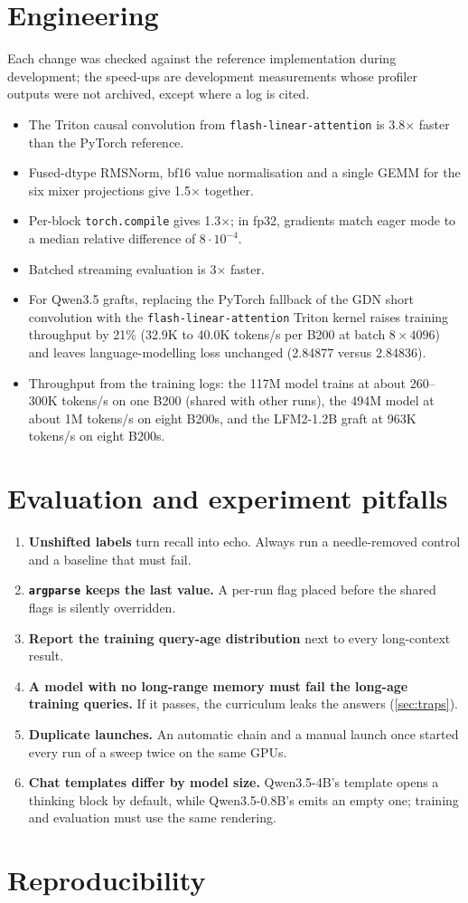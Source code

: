 \documentclass[11pt]{article}
\begin{document}
\section{Engineering}
\label{app:engineering}
Each change was checked against the reference implementation during development; the speed-ups are development measurements whose profiler outputs were not archived, except where a log is cited.
\begin{itemize}
\item The Triton causal convolution from \texttt{flash-linear-attention} is 3.8$\times$ faster than the PyTorch reference.
\item Fused-dtype RMSNorm, bf16 value normalisation and a single GEMM for the six mixer projections give 1.5$\times$ together.
\item Per-block \texttt{torch.compile} gives 1.3$\times$; in fp32, gradients match eager mode to a median relative difference of $8\cdot10^{-4}$.
\item Batched streaming evaluation is 3$\times$ faster.
\item For Qwen3.5 grafts, replacing the PyTorch fallback of the GDN short convolution with the \texttt{flash-linear-attention} Triton kernel raises training throughput by 21\% (32.9K to 40.0K tokens/s per B200 at batch $8\times4096$) and leaves language-modelling loss unchanged (2.84877 versus 2.84836).
\item Throughput from the training logs: the 117M model trains at about 260--300K tokens/s on one B200 (shared with other runs), the 494M model at about 1M tokens/s on eight B200s, and the LFM2-1.2B graft at 963K tokens/s on eight B200s.
\end{itemize}

\section{Evaluation and experiment pitfalls}
\label{app:pitfalls}
\begin{enumerate}
\item \textbf{Unshifted labels} turn recall into echo. Always run a needle-removed control and a baseline that must fail.
\item \textbf{\texttt{argparse} keeps the last value.} A per-run flag placed before the shared flags is silently overridden.
\item \textbf{Report the training query-age distribution} next to every long-context result.
\item \textbf{A model with no long-range memory must fail the long-age training queries.} If it passes, the curriculum leaks the answers (\cref{sec:traps}).
\item \textbf{Duplicate launches.} An automatic chain and a manual launch once started every run of a sweep twice on the same GPUs.
\item \textbf{Chat templates differ by model size.} Qwen3.5-4B's template opens a thinking block by default, while Qwen3.5-0.8B's emits an empty one; training and evaluation must use the same rendering.
\end{enumerate}

\section{Reproducibility}
\label{app:repro}

\end{document}
